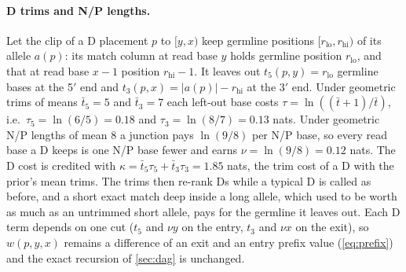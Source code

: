 \documentclass[11pt,a4paper]{article}
\begin{document}
\paragraph{D trims and N/P lengths.} Let the clip of a D placement $p$ to
$[y,x)$ keep germline positions $[r_{\text{lo}},r_{\text{hi}})$ of its
allele $a(p)$: its match column at read base $y$ holds germline position
$r_{\text{lo}}$, and that at read base $x-1$ position $r_{\text{hi}}-1$. It
leaves out $t_5(p,y)=r_{\text{lo}}$ germline bases at the 5$'$ end and
$t_3(p,x)=|a(p)|-r_{\text{hi}}$ at the 3$'$ end. Under geometric trims of
means $\bar t_5=5$ and $\bar t_3=7$ each left-out base costs
$\tau=\ln((\bar t+1)/\bar t)$, i.e.\ $\tau_5=\ln(6/5)=0.18$ and
$\tau_3=\ln(8/7)=0.13$ nats. Under geometric N/P lengths of mean 8 a junction
pays $\ln(9/8)$ per N/P base, so every read base a D keeps is one N/P base
fewer and earns $\nu=\ln(9/8)=0.12$ nats. The D cost is credited with
$\kappa=\bar t_5\tau_5+\bar t_3\tau_3=1.85$ nats, the trim cost of a D with
the prior's mean trims. The trims then re-rank Ds while a typical D is called
as before, and a short exact match deep inside a long allele, which used to
be worth as much as an untrimmed short allele, pays for the germline it
leaves out. Each D term depends on one cut ($t_5$ and $\nu y$ on the entry,
$t_3$ and $\nu x$ on the exit), so $w(p,y,x)$ remains a difference of an
exit and an entry prefix value (\cref{eq:prefix}) and the exact recursion of
\cref{sec:dag} is unchanged.
\end{document}
